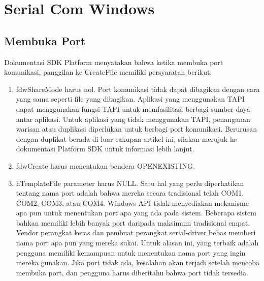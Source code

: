 \section{Serial Com Windows}
	\subsection{Membuka Port}
		Dokumentasi SDK Platform menyatakan bahwa ketika membuka port komunikasi, panggilan ke CreateFile memiliki persyaratan berikut:
		\begin{enumerate} 
			Dokumentasi SDK Platform menyatakan bahwa ketika membuka port komunikasi, panggilan ke CreateFile memiliki persyaratan berikut:
				\item  fdwShareMode harus nol. Port komunikasi tidak dapat dibagikan dengan cara yang sama seperti file yang dibagikan. Aplikasi yang menggunakan TAPI dapat menggunakan fungsi TAPI untuk memfasilitasi berbagi sumber daya antar aplikasi. Untuk aplikasi yang tidak menggunakan TAPI, penanganan warisan atau duplikasi diperlukan untuk berbagi port komunikasi. Berurusan dengan duplikat berada di luar cakupan artikel ini, silakan merujuk ke dokumentasi Platform SDK untuk informasi lebih lanjut.
				\item  fdwCreate harus menentukan bendera OPENEXISTING.
				\item  hTemplateFile parameter harus NULL.
			Satu hal yang perlu diperhatikan tentang nama port adalah bahwa mereka secara tradisional telah COM1, COM2, COM3, atau COM4. Windows API tidak menyediakan mekanisme apa pun untuk menentukan port apa yang ada pada sistem. Beberapa sistem bahkan memiliki lebih banyak port daripada maksimum tradisional empat. Vendor perangkat keras dan pembuat perangkat serial-driver bebas memberi nama port apa pun yang mereka sukai. Untuk alasan ini, yang terbaik adalah pengguna memiliki kemampuan untuk menentukan nama port yang ingin mereka gunakan. Jika port tidak ada, kesalahan akan terjadi setelah mencoba membuka port, dan pengguna harus diberitahu bahwa port tidak tersedia.
		\end{enumerate}
